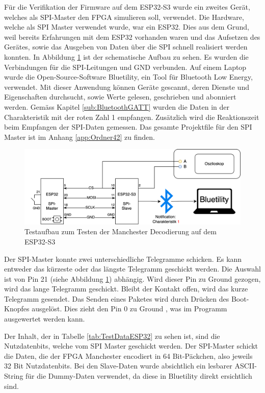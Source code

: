 Für die Verifikation der Firmware auf dem ESP32-S3 wurde ein zweites Gerät, welches als SPI-Master den FPGA simulieren soll, verwendet. Die Hardware, welche als SPI Master verwendet wurde, war ein ESP32. Dies aus dem Grund, weil bereits Erfahrungen mit dem ESP32 vorhanden waren und das Aufsetzen des Gerätes, sowie das Ausgeben von Daten über die SPI schnell realisiert werden konnten. In Abbildung \ref{fig:TestszenarioESP32} ist der schematische Aufbau zu sehen. Es wurden die Verbindungen für die SPI-Leitungen und GND verbunden. Auf einem Laptop wurde die Open-Source-Software Bluetility\cite{BLUETILITY_APPLICATION}, ein Tool für Bluetooth Low Energy, verwendet. Mit dieser Anwendung können Geräte gescannt, deren Dienste und Eigenschaften durchsucht, sowie Werte gelesen, geschrieben und abonniert werden. Gemäss Kapitel \ref{sub:BluetoothGATT} wurden die Daten in der Charakteristik mit der roten Zahl 1 empfangen. Zusätzlich wird die Reaktionszeit beim Empfangen der SPI-Daten gemessen. Das gesamte Projektfile für den SPI Master ist im Anhang \ref{app:Ordner42} zu finden. 

\begin{figure}[H]
    \centering
    \includegraphics[width=0.9\linewidth]{Figures/Chap3/Testszenarien/Testszenario_ESP32.png}
    \caption{Testaufbau zum Testen der Manchester Decodierung auf dem ESP32-S3}
    \label{fig:TestszenarioESP32}
\end{figure}

Der SPI-Master konnte zwei unterschiedliche Telegramme schicken. Es kann entweder das kürzeste oder das längste Telegramm geschickt werden. Die Auswahl ist von Pin 21 (siehe Abbildung \ref{fig:TestszenarioESP32}) abhängig. Wird dieser Pin zu Ground gezogen, wird das lange Telegramm geschickt. Bleibt der Kontakt offen, wird das kurze Telegramm gesendet. Das Senden eines Paketes wird durch Drücken des Boot-Knopfes ausgelöst. Dies zieht den Pin 0 zu Ground , was im Programm ausgewertet werden kann. 

Der Inhalt, der in Tabelle \ref{tab:TestDataESP32} zu sehen ist, sind die Nutzdatenbits, welche vom SPI Master geschickt werden. Der SPI-Master schickt die Daten, die der FPGA Manchester encodiert in 64 Bit-Päckchen, also jeweils 32 Bit Nutzdatenbits. Bei den Slave-Daten wurde absichtlich ein lesbarer ASCII-String für die Dummy-Daten verwendet, da diese in Bluetility direkt ersichtlich sind.

